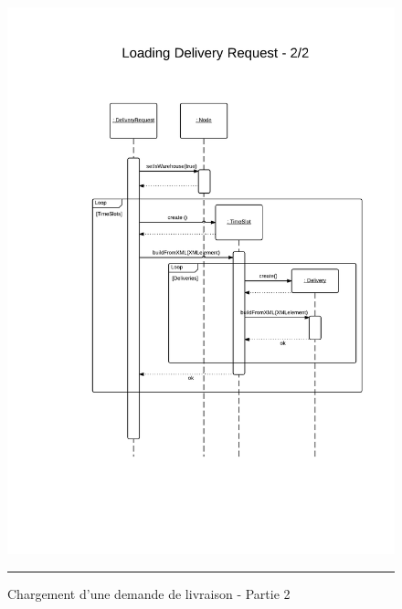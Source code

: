 \begin{figure}[H]
	\centering
		\includegraphics[width=\textwidth,height=\textheight,keepaspectratio]{Figures/chargement2}
		\rule{35em}{0.5pt}
	\caption[Chargement d'une demande de livraison - Partie 2]{Chargement d'une demande de livraison - Partie 2}
\end{figure}

